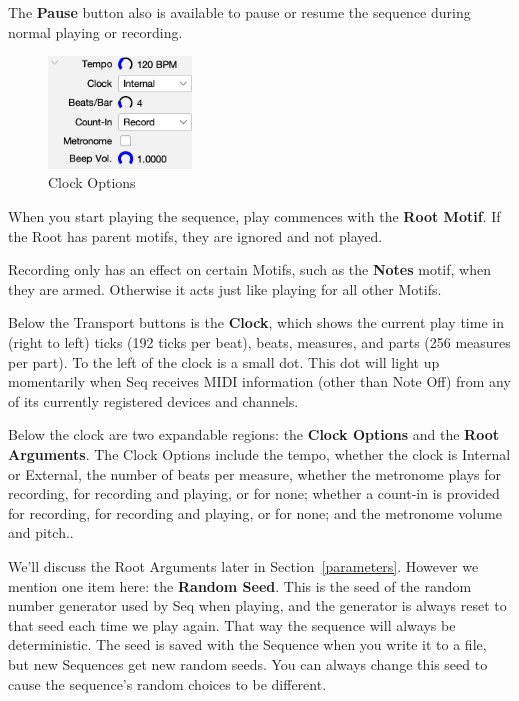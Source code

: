 \documentclass[twoside,10pt]{article}
\begin{document}
The {\bf Pause} button also is available to pause or resume the sequence during normal playing or recording.

\begin{figure}
\includegraphics[width=1.5in]{clock}
\vspace{-2em}
\caption{Clock Options}
\label{clockoptions}
\end{figure}

When you start playing the sequence, play commences with the {\bf Root Motif}.  If the Root has parent motifs, they are ignored and not played.  

Recording only has an effect on certain Motifs, such as the {\bf Notes} motif, when they are armed.  Otherwise it acts just like playing for all other Motifs.

Below the Transport buttons is the {\bf Clock}, which shows the current play time in (right to left) ticks (192 ticks per beat), beats, measures, and parts (256 measures per part).  To the left of the clock is a small dot.  This dot will light up momentarily when Seq receives MIDI information (other than Note Off) from any of its currently registered devices and channels.

Below the clock are two expandable regions: the {\bf Clock Options} and the {\bf Root Arguments}.  The Clock Options include the tempo, whether the clock is Internal or External, the number of beats per measure, whether the metronome plays for recording,  for recording and playing, or for none; whether a count-in is provided for recording, for recording and playing, or for none; and the metronome volume and pitch..

We'll discuss the Root Arguments later in Section~\ref{parameters}.  However we mention one item here: the {\bf Random Seed}.  This is the seed of the random number generator used by Seq when playing, and the generator is always reset to that seed each time we play again.  That way the sequence will always be deterministic.  The seed is saved with the Sequence when you write it to a file, but new Sequences get new random seeds. You can always change this seed to cause the sequence's random choices to be different.
\end{document}

